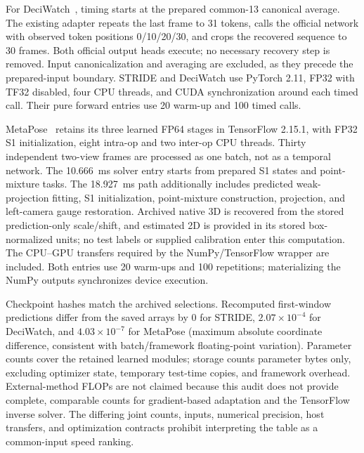 \documentclass[11pt,letterpaper]{article}
\begin{document}
For DeciWatch~\cite{zeng2022deciwatch}, timing starts at the prepared common-13 canonical average. The existing adapter repeats the last frame to 31 tokens, calls the official network with observed token positions 0/10/20/30, and crops the recovered sequence to 30 frames. Both official output heads execute; no necessary recovery step is removed. Input canonicalization and averaging are excluded, as they precede the prepared-input boundary. STRIDE and DeciWatch use PyTorch 2.11, FP32 with TF32 disabled, four CPU threads, and CUDA synchronization around each timed call. Their pure forward entries use 20 warm-up and 100 timed calls.

MetaPose~\cite{usman2022metapose} retains its three learned FP64 stages in TensorFlow 2.15.1, with FP32 S1 initialization, eight intra-op and two inter-op CPU threads. Thirty independent two-view frames are processed as one batch, not as a temporal network. The 10.666~ms solver entry starts from prepared S1 states and point-mixture tasks. The 18.927~ms path additionally includes predicted weak-projection fitting, S1 initialization, point-mixture construction, projection, and left-camera gauge restoration. Archived native 3D is recovered from the stored prediction-only scale/shift, and estimated 2D is provided in its stored box-normalized units; no test labels or supplied calibration enter this computation. The CPU--GPU transfers required by the NumPy/TensorFlow wrapper are included. Both entries use 20 warm-ups and 100 repetitions; materializing the NumPy outputs synchronizes device execution.

Checkpoint hashes match the archived selections. Recomputed first-window predictions differ from the saved arrays by 0 for STRIDE, $2.07\times10^{-4}$ for DeciWatch, and $4.03\times10^{-7}$ for MetaPose (maximum absolute coordinate difference, consistent with batch/framework floating-point variation). Parameter counts cover the retained learned modules; storage counts parameter bytes only, excluding optimizer state, temporary test-time copies, and framework overhead. External-method FLOPs are not claimed because this audit does not provide complete, comparable counts for gradient-based adaptation and the TensorFlow inverse solver. The differing joint counts, inputs, numerical precision, host transfers, and optimization contracts prohibit interpreting the table as a common-input speed ranking.





\end{document}
